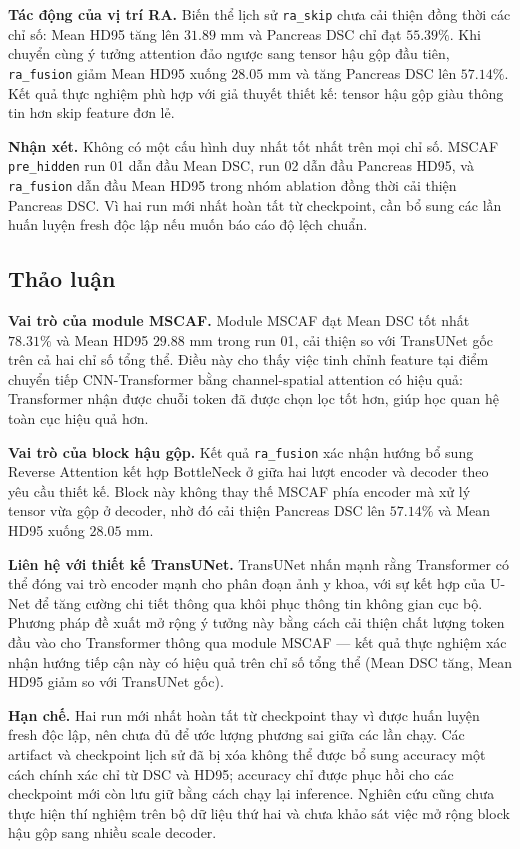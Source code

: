 \documentclass[10pt,a4paper]{article}
\begin{document}
\textbf{Tác động của vị trí RA.} Biến thể lịch sử \texttt{ra\_skip} chưa cải thiện đồng thời các chỉ số: Mean HD95 tăng lên $31.89$ mm và Pancreas DSC chỉ đạt $55.39\%$. Khi chuyển cùng ý tưởng attention đảo ngược sang tensor hậu gộp đầu tiên, \texttt{ra\_fusion} giảm Mean HD95 xuống $28.05$ mm và tăng Pancreas DSC lên $57.14\%$. Kết quả thực nghiệm phù hợp với giả thuyết thiết kế: tensor hậu gộp giàu thông tin hơn skip feature đơn lẻ.

\textbf{Nhận xét.} Không có một cấu hình duy nhất tốt nhất trên mọi chỉ số. MSCAF \texttt{pre\_hidden} run 01 dẫn đầu Mean DSC, run 02 dẫn đầu Pancreas HD95, và \texttt{ra\_fusion} dẫn đầu Mean HD95 trong nhóm ablation đồng thời cải thiện Pancreas DSC. Vì hai run mới nhất hoàn tất từ checkpoint, cần bổ sung các lần huấn luyện fresh độc lập nếu muốn báo cáo độ lệch chuẩn.

\subsection{Thảo luận}

\textbf{Vai trò của module MSCAF.} Module MSCAF đạt Mean DSC tốt nhất $78.31\%$ và Mean HD95 $29.88$ mm trong run 01, cải thiện so với TransUNet gốc trên cả hai chỉ số tổng thể. Điều này cho thấy việc tinh chỉnh feature tại điểm chuyển tiếp CNN-Transformer bằng channel-spatial attention có hiệu quả: Transformer nhận được chuỗi token đã được chọn lọc tốt hơn, giúp học quan hệ toàn cục hiệu quả hơn.

\textbf{Vai trò của block hậu gộp.} Kết quả \texttt{ra\_fusion} xác nhận hướng bổ sung Reverse Attention kết hợp BottleNeck ở giữa hai lượt encoder và decoder theo yêu cầu thiết kế. Block này không thay thế MSCAF phía encoder mà xử lý tensor vừa gộp ở decoder, nhờ đó cải thiện Pancreas DSC lên $57.14\%$ và Mean HD95 xuống $28.05$ mm.

\textbf{Liên hệ với thiết kế TransUNet.} TransUNet \cite{chen2021transunet} nhấn mạnh rằng Transformer có thể đóng vai trò encoder mạnh cho phân đoạn ảnh y khoa, với sự kết hợp của U-Net để tăng cường chi tiết thông qua khôi phục thông tin không gian cục bộ. Phương pháp đề xuất mở rộng ý tưởng này bằng cách cải thiện chất lượng token đầu vào cho Transformer thông qua module MSCAF --- kết quả thực nghiệm xác nhận hướng tiếp cận này có hiệu quả trên chỉ số tổng thể (Mean DSC tăng, Mean HD95 giảm so với TransUNet gốc).

\textbf{Hạn chế.} Hai run mới nhất hoàn tất từ checkpoint thay vì được huấn luyện fresh độc lập, nên chưa đủ để ước lượng phương sai giữa các lần chạy. Các artifact và checkpoint lịch sử đã bị xóa không thể được bổ sung accuracy một cách chính xác chỉ từ DSC và HD95; accuracy chỉ được phục hồi cho các checkpoint mới còn lưu giữ bằng cách chạy lại inference. Nghiên cứu cũng chưa thực hiện thí nghiệm trên bộ dữ liệu thứ hai và chưa khảo sát việc mở rộng block hậu gộp sang nhiều scale decoder.
\end{document}
